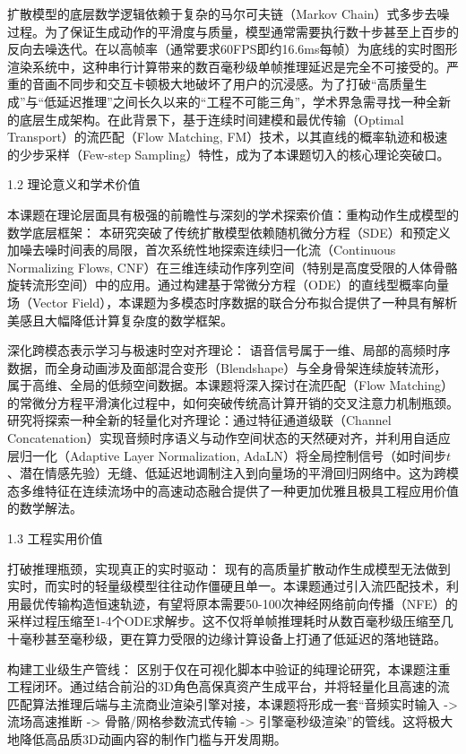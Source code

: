 \documentclass[UTF8]{ctexart}
\begin{document}
扩散模型的底层数学逻辑依赖于复杂的马尔可夫链（Markov
Chain）式多步去噪过程。为了保证生成动作的平滑度与质量，模型通常需要执行数十步甚至上百步的反向去噪迭代。在以高帧率（通常要求60FPS即约16.6ms每帧）为底线的实时图形渲染系统中，这种串行计算带来的数百毫秒级单帧推理延迟是完全不可接受的。严重的音画不同步和交互卡顿极大地破坏了用户的沉浸感。为了打破``高质量生成''与``低延迟推理''之间长久以来的``工程不可能三角''，学术界急需寻找一种全新的底层生成架构。在此背景下，基于连续时间建模和最优传输（Optimal
Transport）的流匹配（Flow Matching,
FM）技术，以其直线的概率轨迹和极速的少步采样（Few-step
Sampling）特性，成为了本课题切入的核心理论突破口。

1.2 理论意义和学术价值

本课题在理论层面具有极强的前瞻性与深刻的学术探索价值：重构动作生成模型的数学底层框架：
本研究突破了传统扩散模型依赖随机微分方程（SDE）和预定义加噪去噪时间表的局限，首次系统性地探索连续归一化流（Continuous
Normalizing Flows,
CNF）在三维连续动作序列空间（特别是高度受限的人体骨骼旋转流形空间）中的应用。通过构建基于常微分方程（ODE）的直线型概率向量场（Vector
Field），本课题为多模态时序数据的联合分布拟合提供了一种具有解析美感且大幅降低计算复杂度的数学框架。

深化跨模态表示学习与极速时空对齐理论：
语音信号属于一维、局部的高频时序数据，而全身动画涉及面部混合变形（Blendshape）与全身骨架连续旋转流形，属于高维、全局的低频空间数据。本课题将深入探讨在流匹配（Flow
Matching）的常微分方程平滑演化过程中，如何突破传统高计算开销的交叉注意力机制瓶颈。研究将探索一种全新的轻量化对齐理论：通过特征通道级联（Channel
Concatenation）实现音频时序语义与动作空间状态的天然硬对齐，并利用自适应层归一化（Adaptive
Layer Normalization,
AdaLN）将全局控制信号（如时间步\(t\)、潜在情感先验）无缝、低延迟地调制注入到向量场的平滑回归网络中。这为跨模态多维特征在连续流场中的高速动态融合提供了一种更加优雅且极具工程应用价值的数学解法。

1.3 工程实用价值

打破推理瓶颈，实现真正的实时驱动：
现有的高质量扩散动作生成模型无法做到实时，而实时的轻量级模型往往动作僵硬且单一。本课题通过引入流匹配技术，利用最优传输构造恒速轨迹，有望将原本需要50-100次神经网络前向传播（NFE）的采样过程压缩至1-4个ODE求解步。这不仅将单帧推理耗时从数百毫秒级压缩至几十毫秒甚至毫秒级，更在算力受限的边缘计算设备上打通了低延迟的落地链路。

构建工业级生产管线：
区别于仅在可视化脚本中验证的纯理论研究，本课题注重工程闭环。通过结合前沿的3D角色高保真资产生成平台，并将轻量化且高速的流匹配算法推理后端与主流商业渲染引擎对接，本课题将形成一套``音频实时输入
-\textgreater{} 流场高速推断 -\textgreater{} 骨骼/网格参数流式传输
-\textgreater{}
引擎毫秒级渲染''的管线。这将极大地降低高品质3D动画内容的制作门槛与开发周期。
\end{document}
